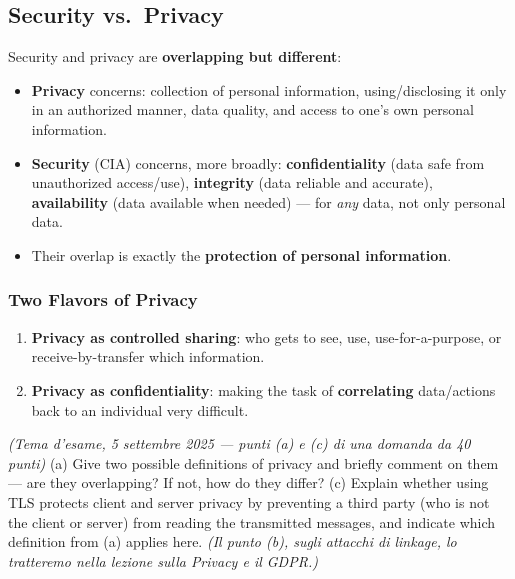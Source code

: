 \documentclass[12pt, a4paper]{article}
\newcounter{esercizio}[section]
\begin{document}
\subsection{Security vs.\ Privacy}

Security and privacy are \textbf{overlapping but different}:
\begin{itemize}
    \item \textbf{Privacy} concerns: collection of personal information, using/disclosing it only in an authorized manner, data quality, and access to one's own personal information.
    \item \textbf{Security} (CIA) concerns, more broadly: \textbf{confidentiality} (data safe from unauthorized access/use), \textbf{integrity} (data reliable and accurate), \textbf{availability} (data available when needed) — for \emph{any} data, not only personal data.
    \item Their overlap is exactly the \textbf{protection of personal information}.
\end{itemize}

\subsubsection{Two Flavors of Privacy}
\begin{enumerate}
    \item \textbf{Privacy as controlled sharing}: who gets to see, use, use-for-a-purpose, or receive-by-transfer which information.
    \item \textbf{Privacy as confidentiality}: making the task of \textbf{correlating} data/actions back to an individual very difficult.
\end{enumerate}

\begin{tcolorbox}[colback=lightergray!10, colframe=tocsec, title=\textbf{Esercizio \theesercizio}]
\textit{(Tema d'esame, 5 settembre 2025 — punti (a) e (c) di una domanda da 40 punti)} (a) Give two possible definitions of privacy and briefly comment on them — are they overlapping? If not, how do they differ? (c) Explain whether using TLS protects client and server privacy by preventing a third party (who is not the client or server) from reading the transmitted messages, and indicate which definition from (a) applies here. \textit{(Il punto (b), sugli attacchi di linkage, lo tratteremo nella lezione sulla Privacy e il GDPR.)}
\end{tcolorbox}
\end{document}
